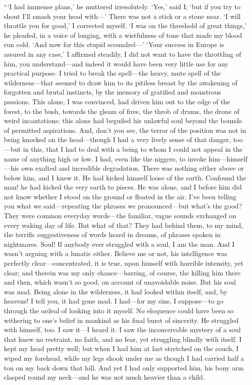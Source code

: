 \documentclass[12pt]{report}
\begin{document}
```I had immense plans,' he muttered irresolutely. `Yes,' said I; `but
if you try to shout I'll smash your head with---' There was not a stick
or a stone near. `I will throttle you for good,' I corrected myself. `I
was on the threshold of great things,' he pleaded, in a voice of
longing, with a wistfulness of tone that made my blood run cold. `And
now for this stupid scoundrel---' `Your success in Europe is assured in
any case,' I affirmed steadily. I did not want to have the throttling of
him, you understand---and indeed it would have been very little use for
any practical purpose. I tried to break the spell---the heavy, mute
spell of the wilderness---that seemed to draw him to its pitiless breast
by the awakening of forgotten and brutal instincts, by the memory of
gratified and monstrous passions. This alone, I was convinced, had
driven him out to the edge of the forest, to the bush, towards the gleam
of fires, the throb of drums, the drone of weird incantations; this
alone had beguiled his unlawful soul beyond the bounds of permitted
aspirations. And, don't you see, the terror of the position was not in
being knocked on the head---though I had a very lively sense of that
danger, too---but in this, that I had to deal with a being to whom I
could not appeal in the name of anything high or low. I had, even like
the niggers, to invoke him---himself---his own exalted and incredible
degradation. There was nothing either above or below him, and I knew it.
He had kicked himself loose of the earth. Confound the man! he had
kicked the very earth to pieces. He was alone, and I before him did not
know whether I stood on the ground or floated in the air. I've been
telling you what we said---repeating the phrases we pronounced---but
what's the good? They were common everyday words---the familiar, vague
sounds exchanged on every waking day of life. But what of that? They had
behind them, to my mind, the terrific suggestiveness of words heard in
dreams, of phrases spoken in nightmares. Soul! If anybody ever struggled
with a soul, I am the man. And I wasn't arguing with a lunatic either.
Believe me or not, his intelligence was perfectly clear---concentrated,
it is true, upon himself with horrible intensity, yet clear; and therein
was my only chance---barring, of course, the killing him there and then,
which wasn't so good, on account of unavoidable noise. But his soul was
mad. Being alone in the wilderness, it had looked within itself, and, by
heavens! I tell you, it had gone mad. I had---for my sins, I
suppose---to go through the ordeal of looking into it myself. No
eloquence could have been so withering to one's belief in mankind as his
final burst of sincerity. He struggled with himself, too. I saw it---I
heard it. I saw the inconceivable mystery of a soul that knew no
restraint, no faith, and no fear, yet struggling blindly with itself. I
kept my head pretty well; but when I had him at last stretched on the
couch, I wiped my forehead, while my legs shook under me as though I had
carried half a ton on my back down that hill. And yet I had only
supported him, his bony arm clasped round my neck---and he was not much
heavier than a child.
\end{document}
